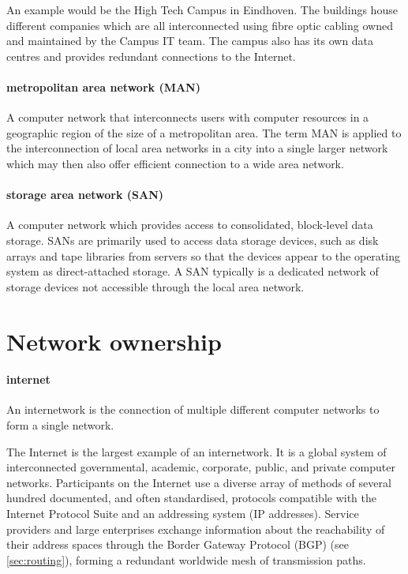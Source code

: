 {An example would be the High Tech Campus in Eindhoven.
The buildings house different companies which are all interconnected using fibre optic cabling owned and maintained by the Campus IT team.
The campus also has its own data centres and provides redundant connections to the Internet.

\paragraph{metropolitan area network (MAN)}
A computer network that interconnects users with computer resources in a geographic region of the size of a metropolitan area.
The term MAN is applied to the interconnection of local area networks in a city into a single larger network which may then also offer efficient connection to a wide area network.

\paragraph{storage area network (SAN)}
A computer network which provides access to consolidated, block-level data storage.
SANs are primarily used to access data storage devices, such as disk arrays and tape libraries from servers so that the devices appear to the operating system as direct-attached storage.
A SAN typically is a dedicated network of storage devices not accessible through the local area network.


\section{Network ownership}
\label{sec:network-ownership}

\paragraph{internet}
An internetwork is the connection of multiple different computer networks to form a single network.

The Internet is the largest example of an internetwork.
It is a global system of interconnected governmental, academic, corporate, public, and private computer networks.
Participants on the Internet use a diverse array of methods of several hundred documented, and often standardised, protocols compatible with the Internet Protocol Suite and an addressing system (IP addresses).
Service providers and large enterprises exchange information about the reachability of their address spaces through the Border Gateway Protocol (BGP) (see \vref{sec:routing}), forming a redundant worldwide mesh of transmission paths.

}
